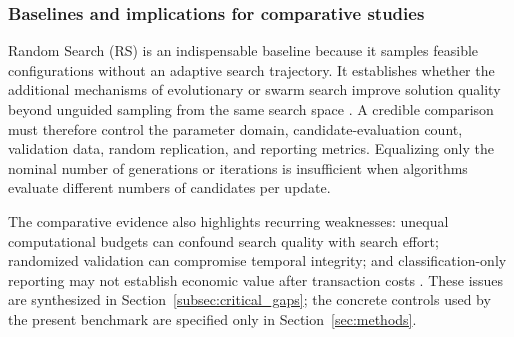 \subsubsection{Baselines and implications for comparative studies}

Random Search (RS) is an indispensable baseline because it samples feasible configurations without an adaptive search trajectory. It establishes whether the additional mechanisms of evolutionary or swarm search improve solution quality beyond unguided sampling from the same search space \cite{bergstra2012random_search}. A credible comparison must therefore control the parameter domain, candidate-evaluation count, validation data, random replication, and reporting metrics. Equalizing only the nominal number of generations or iterations is insufficient when algorithms evaluate different numbers of candidates per update.

The comparative evidence also highlights recurring weaknesses: unequal computational budgets can confound search quality with search effort; randomized validation can compromise temporal integrity; and classification-only reporting may not establish economic value after transaction costs \cite{ecer2020mlp_ga_pso, bandgar2025finchronos, billah2024nca_moving_average}. These issues are synthesized in Section~\ref{subsec:critical_gaps}; the concrete controls used by the present benchmark are specified only in Section~\ref{sec:methods}.

